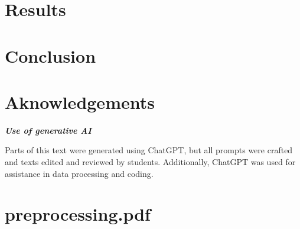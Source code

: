 \documentclass{article}
\begin{document}
\section{Results}
\label{sec:results}

\section{Conclusion}
\label{sec:conclusion}


\pagebreak
\section{Aknowledgements}
\textbf{\textit{Use of generative AI}}

Parts of this text were generated using ChatGPT, but all prompts were crafted and texts edited and reviewed by students. Additionally, ChatGPT was used for assistance in data processing and coding.


\printbibliography


\appendix
\section{preprocessing.pdf}

% 
\end{document}
